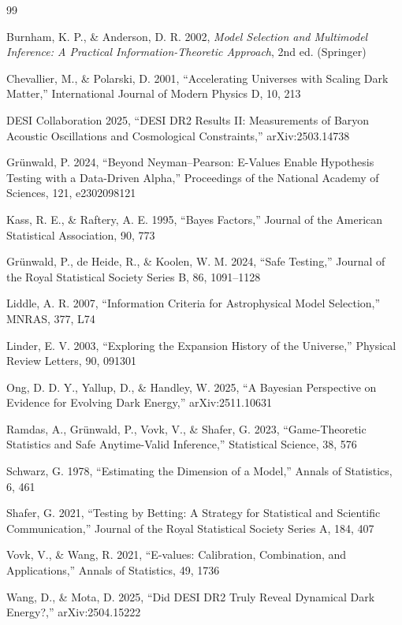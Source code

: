 \documentclass[11pt,a4paper]{article}
\begin{document}

\begin{thebibliography}{99}

Burnham, K. P., \& Anderson, D. R. 2002, \textit{Model Selection and Multimodel Inference: A Practical Information-Theoretic Approach}, 2nd ed. (Springer)

Chevallier, M., \& Polarski, D. 2001, ``Accelerating Universes with Scaling Dark Matter,'' International Journal of Modern Physics D, 10, 213

DESI Collaboration 2025, ``DESI DR2 Results II: Measurements of Baryon Acoustic Oscillations and Cosmological Constraints,'' arXiv:2503.14738

Gr{\"u}nwald, P. 2024, ``Beyond Neyman--Pearson: E-Values Enable Hypothesis Testing with a Data-Driven Alpha,'' Proceedings of the National Academy of Sciences, 121, e2302098121

Kass, R. E., \& Raftery, A. E. 1995, ``Bayes Factors,'' Journal of the American Statistical Association, 90, 773

Gr{\"u}nwald, P., de Heide, R., \& Koolen, W. M. 2024, ``Safe Testing,'' Journal of the Royal Statistical Society Series B, 86, 1091--1128

Liddle, A. R. 2007, ``Information Criteria for Astrophysical Model Selection,'' MNRAS, 377, L74

Linder, E. V. 2003, ``Exploring the Expansion History of the Universe,'' Physical Review Letters, 90, 091301

Ong, D. D. Y., Yallup, D., \& Handley, W. 2025, ``A Bayesian Perspective on Evidence for Evolving Dark Energy,'' arXiv:2511.10631

Ramdas, A., Gr{\"u}nwald, P., Vovk, V., \& Shafer, G. 2023, ``Game-Theoretic Statistics and Safe Anytime-Valid Inference,'' Statistical Science, 38, 576

Schwarz, G. 1978, ``Estimating the Dimension of a Model,'' Annals of Statistics, 6, 461

Shafer, G. 2021, ``Testing by Betting: A Strategy for Statistical and Scientific Communication,'' Journal of the Royal Statistical Society Series A, 184, 407

Vovk, V., \& Wang, R. 2021, ``E-values: Calibration, Combination, and Applications,'' Annals of Statistics, 49, 1736

Wang, D., \& Mota, D. 2025, ``Did DESI DR2 Truly Reveal Dynamical Dark Energy?,'' arXiv:2504.15222

\end{thebibliography}
\end{document}
